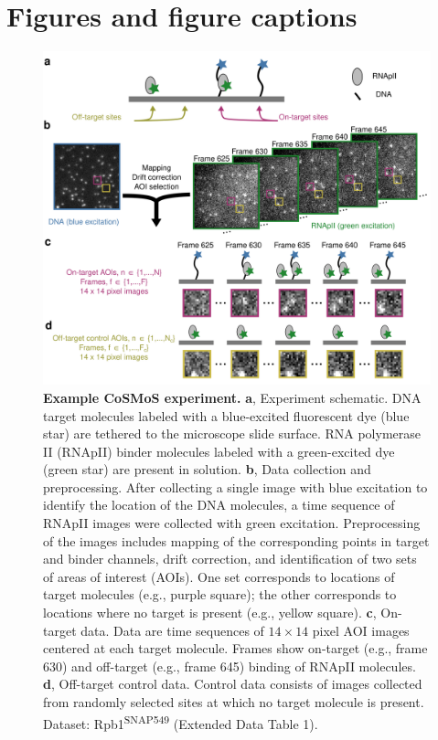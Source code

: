 \clearpage
\newpage
\section*{Figures and figure captions}
\pagebreak

\renewcommand{\figurename}{Fig.}

\begin{figure}[h]
\centering
\includegraphics[width=145mm]{figures/figure1/figure1.png}
\caption{\textbf{Example CoSMoS experiment.} \textbf{a}, Experiment schematic. DNA target molecules labeled with a blue-excited fluorescent dye (blue star) are tethered to the microscope slide surface. RNA polymerase II (RNApII) binder molecules labeled with a green-excited dye (green star) are present in solution. \textbf{b}, Data collection and preprocessing. After collecting a single image with blue excitation to identify the location of the DNA molecules, a time sequence of RNApII images were collected with green excitation.  Preprocessing of the images includes mapping of the corresponding points in target and binder channels, drift correction, and identification of two sets of areas of interest (AOIs).  One set corresponds to locations of target molecules (e.g., purple square); the other corresponds to locations where no target is present (e.g., yellow square). \textbf{c}, On-target data. Data are time sequences of $14 \times 14$ pixel AOI images centered at each target molecule. Frames show on-target (e.g., frame 630) and off-target (e.g., frame 645) binding of RNApII molecules. \textbf{d}, Off-target control data. Control data consists of images collected from randomly selected sites at which no target molecule is present. Dataset: Rpb1\textsuperscript{SNAP549} (Extended Data Table 1). }
\label{fig:cosmos_experiment}
\end{figure}

